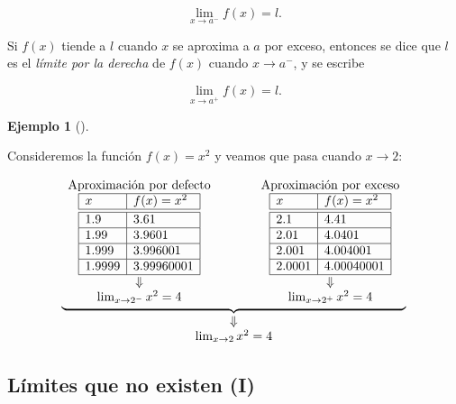 \documentclass[
  a4paper,
]{scrreport}
\theoremstyle{definition}
\newtheorem{example}{Ejemplo}[chapter]
\theoremstyle{plain}
\theoremstyle{definition}
\theoremstyle{definition}
\theoremstyle{plain}
\theoremstyle{plain}
\theoremstyle{remark}
\begin{document}
\[\lim_{x\to a^-}f(x)=l.\]

Si \(f(x)\) tiende a \(l\) cuando \(x\) se aproxima a \(a\) por exceso,
entonces se dice que \(l\) es el \emph{límite por la derecha} de
\(f(x)\) cuando \(x\to a^-\), y se escribe

\[\lim_{x\to a^+}f(x)=l.\]

\begin{example}[]\protect\hypertarget{exm-limites-aproximados}{}\label{exm-limites-aproximados}

Consideremos la función \(f(x)=x^2\) y veamos que pasa cuando
\(x\to 2\):

\[
\begin{array}{c}
\underbrace{\begin{array}{ccc}
\mbox{Aproximación por defecto} & \qquad & \mbox{Aproximación por exceso}\\
\begin{array}{|l|l|}
\hline
x       & f(x)=x^2   \\
\hline\hline
 1.9    & 3.61       \\
\hline
 1.99   & 3.9601     \\
\hline
 1.999  & 3.996001   \\
\hline
 1.9999 & 3.99960001 \\
\hline
\end{array}
& &
\begin{array}{|l|l|}
\hline
x       & f(x)=x^2   \\
\hline\hline
 2.1    & 4.41       \\
\hline
 2.01   & 4.0401    \\
\hline
 2.001  & 4.004001   \\
\hline
 2.0001 & 4.00040001 \\
\hline
\end{array}\\
\Downarrow & & \Downarrow\\
\lim_{x\to 2^-}x^2=4
& &
\lim_{x\to 2^+}x^2=4
\end{array}}\\
\Downarrow\\
\lim_{x\to 2}x^2=4
\end{array}
\]

\end{example}

\subsection{Límites que no existen
(I)}\label{luxedmites-que-no-existen-i}
\end{document}
